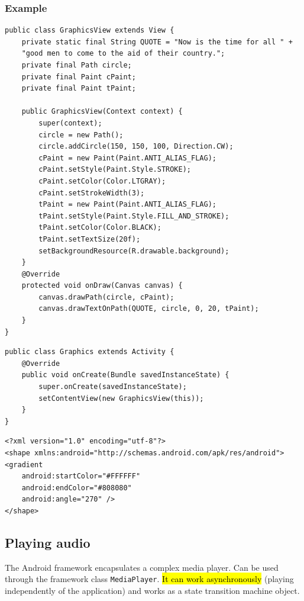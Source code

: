 \subsubsection{Example}

\begin{lstlisting}
public class GraphicsView extends View {
    private static final String QUOTE = "Now is the time for all " +
    "good men to come to the aid of their country.";
    private final Path circle;
    private final Paint cPaint;
    private final Paint tPaint;

    public GraphicsView(Context context) {
        super(context);
        circle = new Path();
        circle.addCircle(150, 150, 100, Direction.CW);
        cPaint = new Paint(Paint.ANTI_ALIAS_FLAG);
        cPaint.setStyle(Paint.Style.STROKE);
        cPaint.setColor(Color.LTGRAY);
        cPaint.setStrokeWidth(3);
        tPaint = new Paint(Paint.ANTI_ALIAS_FLAG);
        tPaint.setStyle(Paint.Style.FILL_AND_STROKE);
        tPaint.setColor(Color.BLACK);
        tPaint.setTextSize(20f);
        setBackgroundResource(R.drawable.background);
    }
    @Override
    protected void onDraw(Canvas canvas) {
        canvas.drawPath(circle, cPaint);
        canvas.drawTextOnPath(QUOTE, circle, 0, 20, tPaint);
    }
}
\end{lstlisting}

\begin{lstlisting}
public class Graphics extends Activity {
    @Override
    public void onCreate(Bundle savedInstanceState) {
        super.onCreate(savedInstanceState);
        setContentView(new GraphicsView(this));
    }
}
\end{lstlisting}

\begin{lstlisting}[title=background.xml on res/drawable]
<?xml version="1.0" encoding="utf-8"?>
<shape xmlns:android="http://schemas.android.com/apk/res/android">
<gradient
    android:startColor="#FFFFFF"
    android:endColor="#808080"
    android:angle="270" />
</shape>
\end{lstlisting}

\subsection{Playing audio}
The Android framework encapsulates a complex media player.
Can be used through the framework class \texttt{MediaPlayer}.
\hl{It can work asynchronously} (playing independently of the application) 
and works as a state transition machine object.

